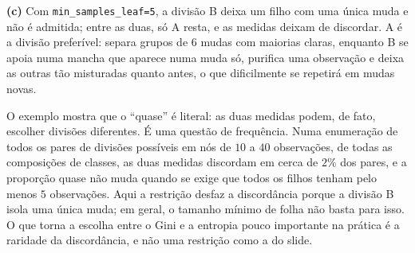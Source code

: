 \begin{solucao}
\smallskip
\textbf{(c)} Com \texttt{min\_samples\_leaf=5}, a divisão B deixa um filho com uma única muda e
não é admitida; entre as duas, só A resta, e as medidas deixam de discordar. A é a divisão
preferível: separa grupos de $6$ mudas com maiorias claras, enquanto B se apoia numa mancha
que aparece numa muda só, purifica uma observação e deixa as outras tão misturadas quanto
antes, o que dificilmente se repetirá em mudas novas.

O exemplo mostra que o ``quase'' é literal: as duas medidas podem, de fato, escolher divisões
diferentes. É uma questão de frequência. Numa enumeração de todos os pares de divisões
possíveis em nós de $10$ a $40$ observações, de todas as composições de classes, as duas medidas
discordam em cerca de $2\%$ dos pares, e a proporção quase não muda quando se exige que todos os
filhos tenham pelo menos $5$ observações. Aqui a restrição desfaz a discordância porque a
divisão B isola uma única muda; em geral, o tamanho mínimo de folha não basta para isso. O que
torna a escolha entre o Gini e a entropia pouco importante na prática é a raridade da
discordância, e não uma restrição como a do slide.
\end{solucao}
